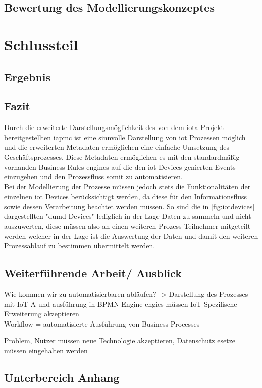 \documentclass[a4paper, 12pt, twoside, headsepline=true]{scrartcl} %
\begin{document}
\newpage

\subsection{Bewertung des Modellierungskonzeptes}

\section{Schlussteil}

\subsection{Ergebnis}

\subsection{Fazit}

Durch die erweiterte Darstellungsmöglichkeit des von dem \acl{iota} Projekt bereitgestellten \acl{iapmc} ist eine sinnvolle Darstellung von \ac{iot} Prozessen möglich und die erweiterten Metadaten ermöglichen eine einfache Umsetzung des Geschäftsprozesses. Diese Metadaten ermöglichen es mit den standardmäßig vorhanden Business Rules engines auf die den \ac{iot} Devices genierten Events einzugehen und den Prozessfluss somit zu automatisieren.\\
Bei der Modellierung der Prozesse müssen jedoch stets die Funktionalitäten der einzelnen \ac{iot} Devices berücksichtigt werden, da diese für den Informationsfluss sowie dessen Verarbeitung beachtet werden müssen. So sind die in \ref{fig:iotdevices} dargestellten "dumd Devices" lediglich in der Lage Daten zu sammeln und nicht auszuwerten, diese müssen also an einen weiteren Prozess Teilnehmer mitgeteilt werden welcher in der Lage ist die Auswertung der Daten und damit den weiteren Prozessablauf zu bestimmen übermittelt werden.\\

\subsection{Weiterführende Arbeit/ Ausblick}
Wie kommen wir zu automatisierbaren abläufen? -> Darstellung des Prozesses mit IoT-A und ausführung in BPMN Engine engies müssen IoT Spezifische Erweiterung akzeptieren\\
Workflow = automatisierte Ausführung von Business Processes

Problem, Nutzer müssen neue Technologie akzeptieren, Datenschutz esetze müssen eingehalten werden
\newpage

\printbibliography[heading=none]
\newpage
{}
\subsection*{Unterbereich Anhang}
\end{document}
